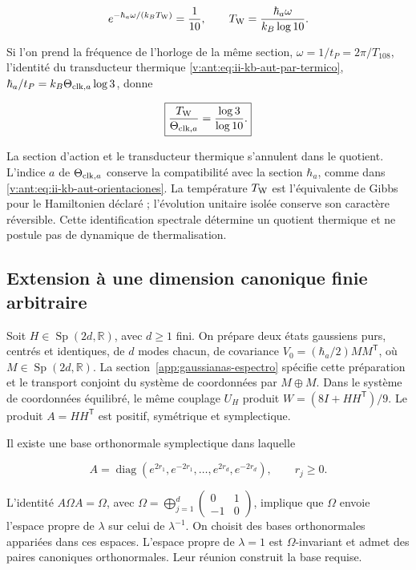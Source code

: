 \[
e^{-\hbar_a\omega/(k_BT_{\rm W})}=\frac1{10},\qquad
T_{\rm W}=\frac{\hbar_a\omega}{k_B\log10}.
\]



Si l’on prend la fréquence de l’horloge de la même section, \(\omega=1/t_P=2\pi/T_{108}\), l’identité du transducteur thermique \eqref{v:ant:eq:ii-kb-aut-par-termico},
\(\hbar_a/t_P=k_B\Theta_{{\rm clk},a}\log3\), donne




\begin{equation}
\boxed{\frac{T_{\rm W}}{\Theta_{{\rm clk},a}}=\frac{\log3}{\log10}.}
\label{nuc12:eq:5.11}
\end{equation}



La section d’action et le transducteur thermique s’annulent dans le quotient. L’indice \(a\) de \(\Theta_{{\rm clk},a}\) conserve la compatibilité avec la section \(\hbar_a\), comme dans \eqref{v:ant:eq:ii-kb-aut-orientaciones}. La température \(T_{\rm W}\) est l’équivalente de Gibbs pour le Hamiltonien déclaré ; l’évolution unitaire isolée conserve son caractère réversible. Cette identification spectrale détermine un quotient thermique et ne postule pas de dynamique de thermalisation.

\subsection{Extension à une dimension canonique finie arbitraire
}

Soit \(H\in\operatorname{Sp}(2d,\mathbb R)\), avec \(d\geq1\) fini. On prépare deux états gaussiens purs, centrés et identiques, de \(d\) modes chacun, de covariance \(V_0=(\hbar_a/2)MM^{\mathsf T}\), où \(M\in\operatorname{Sp}(2d,\mathbb R)\). La section~\ref{app:gaussianas-espectro} spécifie cette préparation et le transport conjoint du système de coordonnées par \(M\oplus M\). Dans le système de coordonnées équilibré, le même couplage \(U_H\) produit \(W=(8I+HH^{\mathsf T})/9\). Le produit \(A=HH^{\mathsf T}\) est positif, symétrique et symplectique.

Il existe une base orthonormale symplectique dans laquelle



\[
A=\operatorname{diag}(e^{2r_1},e^{-2r_1},\ldots,
e^{2r_d},e^{-2r_d}),\qquad r_j\ge0.
\]



L’identité \(A\Omega A=\Omega\), avec \(\Omega=\bigoplus_{j=1}^d\left(
\begin{smallmatrix}0&1\\-1&0\end{smallmatrix}\right)\), implique que \(\Omega\) envoie l’espace propre de \(\lambda\) sur celui de \(\lambda^{-1}\). On choisit des bases orthonormales appariées dans ces espaces. L’espace propre de \(\lambda=1\) est \(\Omega\)-invariant et admet des paires canoniques orthonormales. Leur réunion construit la base requise.


